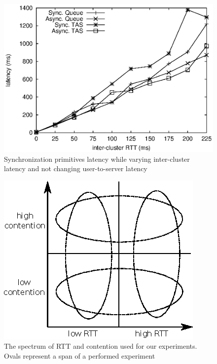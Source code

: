 \begin{figure}[h]
\centering
\includegraphics[scale=0.68]{img/primitives_fixUserLatency-0.eps}
\caption{Synchronization primitives latency while varying inter-cluster latency and not changing user-to-server latency}
\label{fig:primitives_vary_intercluster}
\end{figure}

\begin{figure}[h]
\centering
\includegraphics[scale=1.55]{img/spectrum.eps}
\caption{The spectrum of RTT and contention used for our experiments. Ovals represent a span of a performed experiment}
\label{fig:spectrum}
\end{figure}

